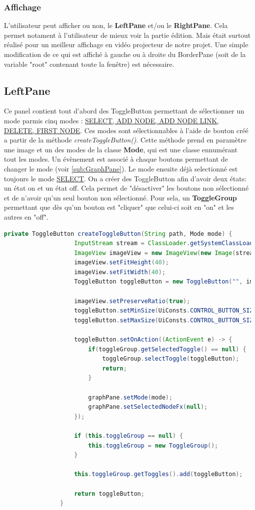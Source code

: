 			\subsubsection{Affichage}
			L'utilisateur peut afficher ou non, le \textbf{LeftPane} et/ou le \textbf{RightPane}. Cela permet notament à l'utilisateur de mieux voir la partie édition. Mais était surtout réalisé pour un meilleur affichage en vidéo projecteur de notre projet.
			Une simple modification de ce qui est affiché à gauche ou à droite du BorderPane (soit de la variable "root" contenant toute la fenêtre) est nécessaire.


		\subsection{LeftPane}
			Ce panel contient tout d'abord des ToggleButton permettant de sélectionner un mode parmis cinq modes : \underline{SELECT, ADD NODE, ADD NODE LINK, DELETE, FIRST NODE}. Ces modes sont sélectionnables à l'aide de bouton créé a partir de la méthode \textit{createToggleButton()}. Cette méthode prend en paramètre une image et un des modes de la classe \textbf{Mode}, qui est une classe ennumérant tout les modes. Un évènement est associé à chaque boutons permettant de changer le mode (voir \ref{sub:GraphPane}). Le mode ensuite déjà selectionné est toujours le mode \underline{SELECT}. On a créer des ToggleButton afin d'avoir deux états: un état on et un état off. Cela permet de "désactiver" les boutons non sélectionné et de n'avoir qu'un seul bouton non sélectionné. Pour sela, un \textbf{ToggleGroup} permettant que dès qu'un bouton est "cliquer" que celui-ci soit en "on" et les autres en "off".

			\begin{lstlisting}[gobble=16, language=java, caption=Création du ToggleButton]
				private ToggleButton createToggleButton(String path, Mode mode) {
					InputStream stream = ClassLoader.getSystemClassLoader().getResourceAsStream(path);
					ImageView imageView = new ImageView(new Image(stream));
					imageView.setFitHeight(40);
					imageView.setFitWidth(40);
					ToggleButton toggleButton = new ToggleButton("", imageView);

					imageView.setPreserveRatio(true);
					toggleButton.setMinSize(UiConsts.CONTROL_BUTTON_SIZE, UiConsts.CONTROL_BUTTON_SIZE);
					toggleButton.setMaxSize(UiConsts.CONTROL_BUTTON_SIZE, UiConsts.CONTROL_BUTTON_SIZE);

					toggleButton.setOnAction((ActionEvent e) -> {
						if(toggleGroup.getSelectedToggle() == null) {
							toggleGroup.selectToggle(toggleButton);
							return;
						}

						graphPane.setMode(mode);
						graphPane.setSelectedNodeFx(null);
					});

					if (this.toggleGroup == null) {
						this.toggleGroup = new ToggleGroup();
					}

					this.toggleGroup.getToggles().add(toggleButton);

					return toggleButton;
				}
			\end{lstlisting}

